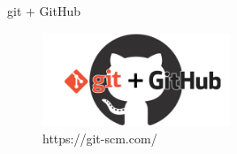 \begin{frame}{git $+$ GitHub}
    \begin{center}
        \begin{figure}[h]
            \includegraphics[width=0.5\textwidth]{imagens/git_github.jpeg}
            \caption{https://git-scm.com/}
        \end{figure}
	\end{center}
\end{frame}